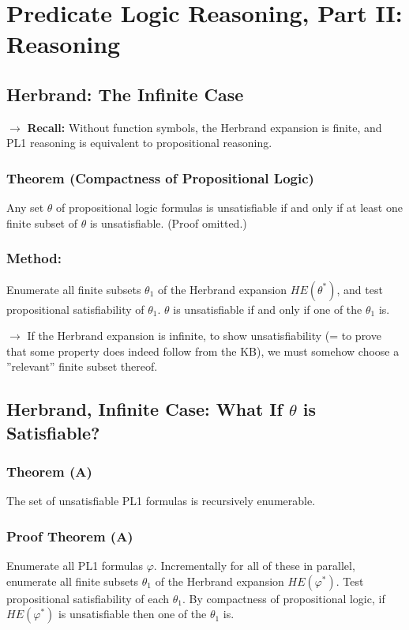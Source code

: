 \documentclass[conference]{styles/acmsiggraph}
\begin{document}
    
    
    
\section{Predicate Logic Reasoning, Part II: Reasoning}
    \subsection{Herbrand: The Infinite Case}
        $\rightarrow$ \textbf{Recall:} Without function symbols, the Herbrand expansion is finite, and PL1 reasoning is equivalent to propositional reasoning.
        
        \subsubsection{Theorem (Compactness of Propositional Logic)}
            Any set $\theta$ of propositional logic formulas is unsatisfiable if and only if at least one finite subset of $\theta$ is unsatisfiable. (Proof omitted.)
        
        \subsubsection{Method:}
            Enumerate all finite subsets $\theta_1$ of the Herbrand expansion $HE(\theta^*)$, and test propositional satisfiability of $\theta_1$.
            $\theta$ is unsatisfiable if and only if one of the $\theta_1$ is.
        
        $\rightarrow$ If the Herbrand expansion is infinite, to show unsatisfiability (= to prove that some property does indeed follow from the KB), we must somehow choose a ''relevant'' finite subset thereof.
        
        
    \subsection{Herbrand, Infinite Case: What If $\theta$ is Satisfiable?}
        \subsubsection{Theorem (A)}
            The set of unsatisfiable PL1 formulas is recursively enumerable.
        
        \subsubsection{Proof Theorem (A)}
            Enumerate all PL1 formulas $\varphi$. 
            Incrementally for all of these in parallel, enumerate all finite subsets $\theta_1$ of the Herbrand expansion $HE(\varphi^*)$.
            Test propositional satisfiability of each $\theta_1$. 
            By compactness of propositional logic, if $HE(\varphi^*)$ is unsatisfiable then one of the $\theta_1$ is.
        
\end{document}

